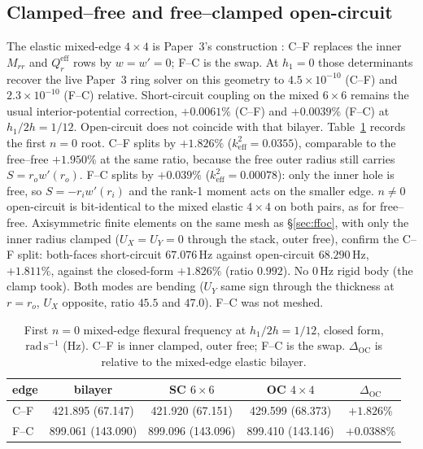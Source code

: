 \documentclass[11pt]{article}
\begin{document}
\subsection{Clamped--free and free--clamped open-circuit}
\label{sec:cf}
The elastic mixed-edge $4\times4$ is Paper~3's construction
\cite{mccune2026ring}: C--F replaces the inner $M_{rr}$ and $Q_r^{\mathrm{eff}}$ rows
by $w=w'=0$; F--C is the swap. At $h_1=0$ those determinants recover
the live Paper~3 ring solver on this geometry to $4.5\times10^{-10}$
(C--F) and $2.3\times10^{-10}$ (F--C) relative. Short-circuit coupling
on the mixed $6\times6$ remains the usual interior-potential correction,
$+0.0061\%$ (C--F) and $+0.0039\%$ (F--C) at $h_1/2h=1/12$.
Open-circuit does not coincide with that bilayer. Table~\ref{tab:cf}
records the first $n=0$ root. C--F splits by $+1.826\%$
($k_{\mathrm{eff}}^2=0.0355$), comparable to the free--free
$+1.950\%$ at the same ratio, because the free outer radius still
carries $S=r_o w'(r_o)$. F--C splits by $+0.039\%$
($k_{\mathrm{eff}}^2=0.00078$): only the inner hole is free, so
$S=-r_i w'(r_i)$ and the rank-1 moment acts on the smaller edge.
$n\neq0$ open-circuit is bit-identical to the mixed elastic $4\times4$
on both pairs, as for free--free. Axisymmetric finite elements on the
same mesh as \S\ref{sec:ffoc}, with only the inner radius clamped
($U_X=U_Y=0$ through the stack, outer free), confirm the C--F split:
both-faces short-circuit $67.076\,\mathrm{Hz}$ against open-circuit
$68.290\,\mathrm{Hz}$, $+1.811\%$, against the closed-form $+1.826\%$
(ratio $0.992$). No $0\,\mathrm{Hz}$ rigid body (the clamp took). Both
modes are bending ($U_Y$ same sign through the thickness at $r=r_o$,
$U_X$ opposite, ratio $45.5$ and $47.0$). F--C was not meshed.

\begin{table}[H]
\centering
\caption{First $n=0$ mixed-edge flexural frequency at $h_1/2h=1/12$,
closed form, $\mathrm{rad\,s^{-1}}$ (Hz). C--F is inner clamped, outer
free; F--C is the swap. $\Delta_{\mathrm{OC}}$ is relative to the
mixed-edge elastic bilayer.}
\label{tab:cf}
\small
\begin{tabular}{@{}lcccc@{}}
\toprule
edge & bilayer & SC $6\times6$ & OC $4\times4$ & $\Delta_{\mathrm{OC}}$ \\
\midrule
C--F & 421.895 (67.147) & 421.920 (67.151) & 429.599 (68.373) & $+1.826\%$ \\
F--C & 899.061 (143.090) & 899.096 (143.096) & 899.410 (143.146) & $+0.0388\%$ \\
\bottomrule
\end{tabular}
\end{table}
\end{document}
